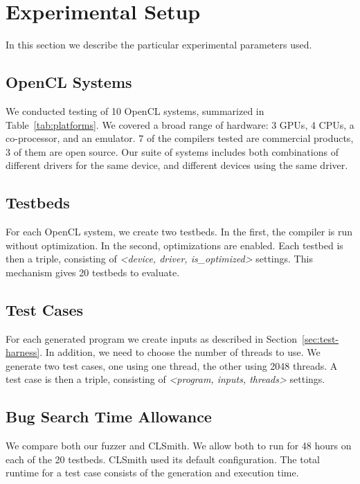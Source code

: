 \section{Experimental Setup}

In this section we describe the particular experimental parameters used.

\subsection{OpenCL Systems}

\begin{table*}[t!]
  \footnotesize %
  \centering %
  
  \caption{%
    OpenCL systems and the number of bug reports submitted to date. For each system, two testbeds are created, one with compiler optimizations, the other without. %
  }
  \label{tab:platforms}
\end{table*}

We conducted testing of 10 OpenCL systems, summarized in Table~\ref{tab:platforms}.  We covered a broad range of hardware: 3 GPUs, 4 CPUs, a co-processor, and an emulator. 7 of the compilers tested are commercial products, 3 of them are open source. Our suite of systems includes both combinations of different drivers for the same device, and different devices using the same driver.

\subsection{Testbeds}
For each OpenCL system, we create two testbeds. In the first, the compiler is run without optimization. In the second, optimizations are enabled. Each testbed is then a triple, consisting of \emph{<device, driver, is\_optimized>} settings. This mechanism gives 20 testbeds to evaluate.

\subsection{Test Cases}
For each generated program we create inputs as described in Section~\ref{sec:test-harness}. In addition, we need to choose the number of threads to use. We generate two test cases, one using one thread, the other using 2048 threads. A test case is then a triple, consisting of \emph{<program, inputs, threads>} settings.

\subsection{Bug Search Time Allowance}
We compare both our fuzzer and CLSmith. We allow both to run for 48 hours on each of the 20 testbeds.  CLSmith used its default configuration. The total runtime for a test case consists of the generation and execution time.
